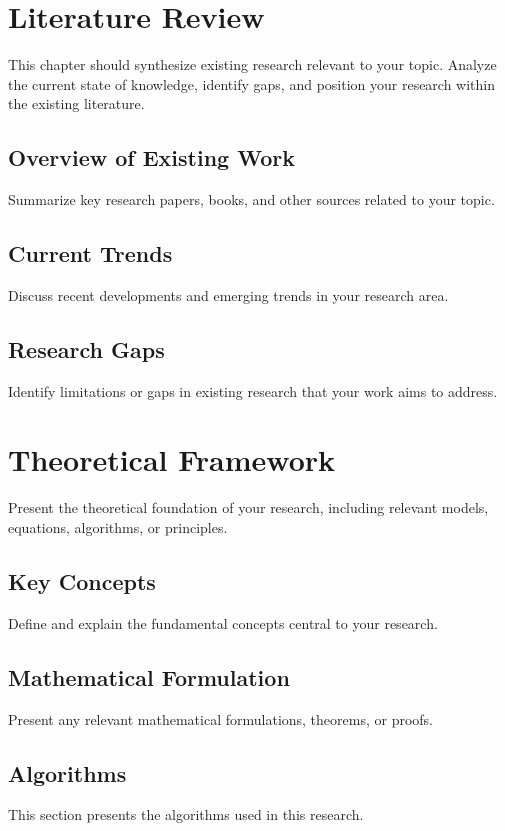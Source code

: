 \documentclass[12pt,a4paper]{report}
\begin{document}
\begin{spacing}{1.5}
    \chapter{Literature Review}
    This chapter should synthesize existing research relevant to your topic. Analyze the current state of knowledge, identify gaps, and position your research within the existing literature.

    \section{Overview of Existing Work}
    Summarize key research papers, books, and other sources related to your topic.

    \section{Current Trends}
    Discuss recent developments and emerging trends in your research area.

    \section{Research Gaps}
    Identify limitations or gaps in existing research that your work aims to address.

    \chapter{Theoretical Framework}
    Present the theoretical foundation of your research, including relevant models, equations, algorithms, or principles.

    \section{Key Concepts}
    Define and explain the fundamental concepts central to your research.

    \section{Mathematical Formulation}
    Present any relevant mathematical formulations, theorems, or proofs.

    \section{Algorithms}
    This section presents the algorithms used in this research.


\end{spacing}
\end{document}
